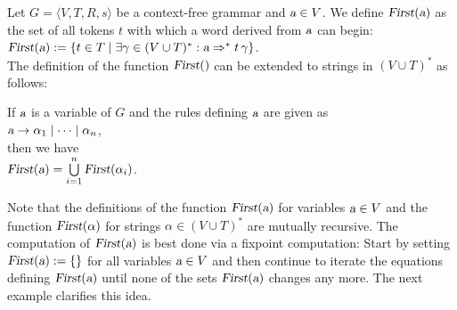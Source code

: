 \begin{Definition}
Let \(G = \langle V, T, R, s \rangle\) be a context-free grammar and \(\textsl{a} \in V\).
We define \(\textsl{First}(\textsl{a})\) as the set of all tokens \(t\) with which a
word derived from \(\textsl{a}\) can begin:
\\[0.2cm]
\hspace*{1.3cm}
\(\textsl{First}(\textsl{a}) := \{ t \in T \mid \exists \gamma \in (V \cup T)^*: \textsl{a} \Rightarrow^* t\,\gamma \}\).
\\[0.2cm]
The definition of the function \(\textsl{First}()\) can be extended to strings in \((V \cup T)^*\) as follows: 
If \(\textsl{a}\) is a variable of \(G\) and the rules defining \(\textsl{a}\) are given as 
\\[0.2cm]
\hspace*{1.3cm}
\(\textsl{a} \rightarrow \alpha_1 \mid \cdots \mid \alpha_n\),
\\[0.2cm]
then we have
\\[0.2cm]
\hspace*{1.3cm}
\(\textsl{First}(\textsl{a}) = \bigcup\limits_{i=1}^n \textsl{First}(\alpha_i)\).   \eox
\end{Definition}

\remarkEng
Note that the definitions of the function $\textsl{First}(\textsl{a})$ for variables
$\textsl{a} \in V$ and the function $\textsl{First}(\alpha)$ for strings $\alpha \in (V \cup T)^*$
are mutually recursive.  The computation of $\textsl{First}(\textsl{a})$ is best done via a 
fixpoint computation:  Start by setting $\textsl{First}(\textsl{a}) := \{\}$ for all variables $\textsl{a}\in V$ and
then continue to iterate the equations defining $\textsl{First}(\textsl{a})$ until none of the sets
$\textsl{First}(\textsl{a})$ changes any more.  The next example clarifies this idea.

